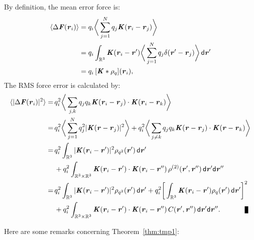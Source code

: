 \documentclass[aps,pre,preprint]{revtex4}
\renewcommand{\v}[1]{\textbf{\textit{#1}}}
\renewcommand{\d}[1]{\textsf{#1}}
\newenvironment{proof}[1][Proof]{\begin{trivlist}
\item[\hskip \labelsep {\bfseries #1}]}{\end{trivlist}}
\newcommand{\qed}{\nobreak \ifvmode \relax \else
      \ifdim\lastskip<1.5em \hskip-\lastskip
      \hskip1.5em plus0em minus0.5em \fi \nobreak
      \vrule height0.75em width0.5em depth0.25em\fi}
\begin{document}
\begin{proof}
  By definition, the mean error force is:
  \begin{align*}
    \langle\Delta\v F(\v r_i)\rangle
    &=
    q_i\bigg\langle \sum_{j=1}^Nq_j\v K(\v r_i -\v r_j)\bigg\rangle\\
    &=
    q_i\int_{\mathbb R^3}\v K(\v r_i - \v r')
    \bigg\langle \sum_{j=1}^Nq_j\delta (\v r' -\v r_j)\bigg\rangle
    \,\d d\v r'\\
    &= 
    q_i\, [\v K\ast\rho_q](\v r_i),
  \end{align*}
  The RMS force error is calculated by:
  \begin{align} \nonumber
    \langle\vert\Delta\v F(\v r_i)\vert^2\rangle
    =\,&
    q_i^2\bigg\langle\sum_{j,k}
    q_jq_k\v K(\v r_i - \v r_j)\cdot\v K(\v r_i - \v r_k)\bigg\rangle \\ \nonumber
    =\,&
    q_i^2\bigg\langle\sum_{j=1}^N
    q_j^2\vert\v K(\v r - \v r_j)\vert^2
    \bigg\rangle +
    q_i^2\bigg\langle\sum_{j\neq k}
    q_jq_k \v K(\v r - \v r_j)\cdot\v K(\v r - \v r_k)
    \bigg\rangle \\ \nonumber
    =\,&
    q_i^2\int_{\mathbb R^3}
    \vert\v K(\v r_i - \v r')\vert^2\rho_{q^2}(\v r')\,\d d\v r'
    \\\label{eqn:prf-error-step3}
    & +
    q_i^2\int_{\mathbb R^3\times\mathbb R^3}
    \v K(\v r_i - \v r')\cdot\v K(\v r_i - \v r'')\,
    \rho^{(2)}(\v r', \v r'')
    \,\d d\v r'\d d\v r''\\\nonumber
    =\,&
    q_i^2\int_{\mathbb R^3}
    \vert\v K(\v r_i - \v r')\vert^2\rho_{q^2}(\v r')\,\d d\v r'
    +
    q_i^2
    \bigg[
    \int_{\mathbb R^3}
    \v K(\v r_i - \v r')\rho_{q}(\v r')\,\d d\v r'
    \bigg]^2
    \\ \nonumber
    & +
    q_i^2\int_{\mathbb R^3\times\mathbb R^3}
    \v K(\v r_i - \v r')\cdot\v K(\v r_i - \v r'')\,
    C(\v r', \v r'')
    \,\d d\v r'\d d\v r''.\qquad\qed
  \end{align}
\end{proof}
Here are some remarks concerning Theorem~\ref{thm:tmp1}:
\end{document}
